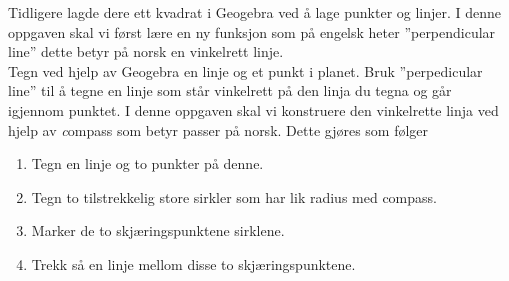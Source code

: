 \documentclass[12pt]{exam}
\begin{document}
\begin{questions}
\question
 Tidligere lagde dere ett kvadrat i Geogebra ved å lage punkter og linjer. I denne oppgaven skal vi først lære en ny funksjon som på engelsk heter ''perpendicular line'' dette betyr på norsk en vinkelrett linje.\\
 Tegn ved hjelp av Geogebra en linje og et punkt i planet. Bruk ''perpedicular line'' til å tegne en linje som står vinkelrett på den linja du tegna og går igjennom punktet.
\newpage
 \question
 I denne oppgaven skal vi konstruere den vinkelrette linja ved hjelp av {\emph compass} som betyr passer på norsk. Dette gjøres som følger
 \begin{enumerate}
 \item Tegn en linje og to punkter på denne.
 \item Tegn to tilstrekkelig store sirkler som har lik radius med compass.
 \item Marker de to skjæringspunktene sirklene.
 \item Trekk så en linje mellom disse to skjæringspunktene.
 \end{enumerate}


\end{questions}
\end{document}
